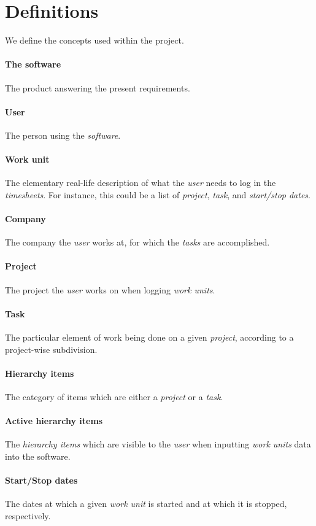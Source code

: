 \section{Definitions}
We define the concepts used within the project.

\paragraph{The software} The product answering the present requirements.
\paragraph{User} The person using the \emph{software}.
\paragraph{Work unit} The elementary real-life description of what the
  \emph{user} needs to log in the \emph{timesheets}. For instance, this could be
  a list of \emph{project}, \emph{task}, and \emph{start/stop dates}.
\paragraph{Company} The company the \emph{user} works at, for which the
  \emph{tasks} are accomplished.
\paragraph{Project} The project the \emph{user} works on when logging
  \emph{work units}.
\paragraph{Task} The particular element of work being done on a given
  \emph{project}, according to a project-wise subdivision.
\paragraph{Hierarchy items} The category of items which are either a
  \emph{project} or a \emph{task}.
\paragraph{Active hierarchy items} The \emph{hierarchy items} which are
  visible to the \emph{user} when inputting \emph{work units} data into the
  software.
\paragraph{Start/Stop dates} The dates at which a given \emph{work unit} is
  started and at which it is stopped, respectively.
